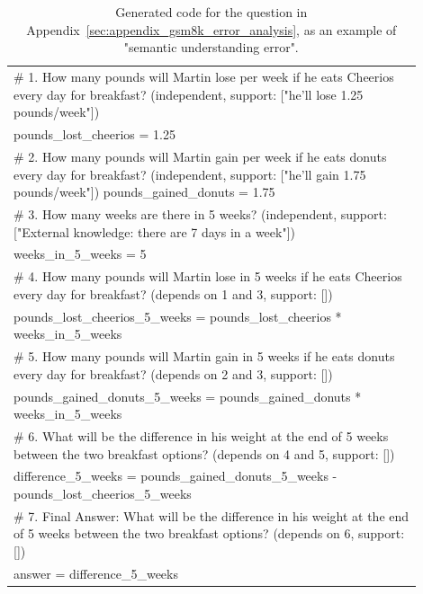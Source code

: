 \begingroup
\begin{table}[h]
    \centering
    \small
    \begin{tabular}{p{0.9\linewidth}}
        \toprule
        \vspace{-2mm}
                  \# 1. How many pounds will Martin lose per week if he eats Cheerios every day for breakfast? (independent, support: ["he'll lose 1.25 pounds/week"])\\
pounds\_lost\_cheerios = 1.25\\
\# 2. How many pounds will Martin gain per week if he eats donuts every day for breakfast? (independent, support: ["he'll gain 1.75 pounds/week"])
pounds\_gained\_donuts = 1.75\\
\# 3. How many weeks are there in 5 weeks? (independent, support: ["External knowledge: there are 7 days in a week"])\\
weeks\_in\_5\_weeks = 5\\
\# 4. How many pounds will Martin lose in 5 weeks if he eats Cheerios every day for breakfast? (depends on 1 and 3, support: [])\\
pounds\_lost\_cheerios\_5\_weeks = pounds\_lost\_cheerios * weeks\_in\_5\_weeks\\
\# 5. How many pounds will Martin gain in 5 weeks if he eats donuts every day for breakfast? (depends on 2 and 3, support: [])\\
pounds\_gained\_donuts\_5\_weeks = pounds\_gained\_donuts * weeks\_in\_5\_weeks\\
\# 6. What will be the difference in his weight at the end of 5 weeks between the two breakfast options? (depends on 4 and 5, support: [])\\
difference\_5\_weeks = pounds\_gained\_donuts\_5\_weeks - pounds\_lost\_cheerios\_5\_weeks\\
\# 7. Final Answer: What will be the difference in his weight at the end of 5 weeks between the two breakfast options? (depends on 6, support: [])\\
answer = difference\_5\_weeks\\
        \bottomrule
    \end{tabular}
       \caption{
    Generated code for the question in Appendix~\ref{sec:appendix_gsm8k_error_analysis}, as an example of "semantic understanding error".
    } 
    \label{tab:appendix-ea}
    
\end{table}
\endgroup